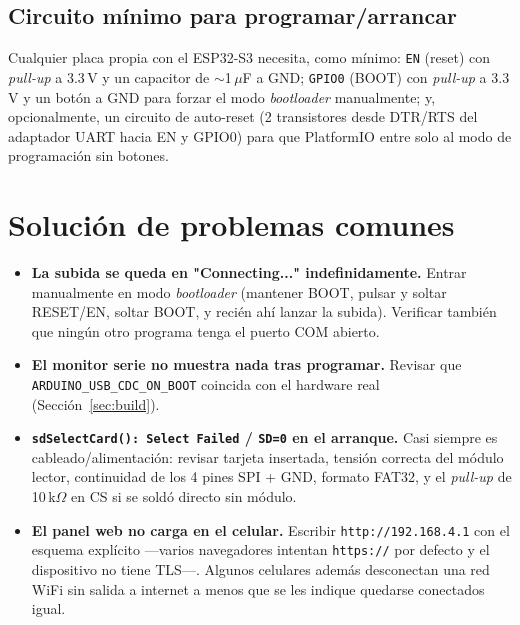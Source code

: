 \subsection{Circuito mínimo para programar/arrancar}
Cualquier placa propia con el ESP32-S3 necesita, como mínimo: \texttt{EN}
(reset) con \textit{pull-up} a 3.3\,V y un capacitor de $\sim$1\,$\mu$F a
GND; \texttt{GPIO0} (BOOT) con \textit{pull-up} a 3.3\,V y un botón a GND
para forzar el modo \textit{bootloader} manualmente; y, opcionalmente, un
circuito de auto-reset (2 transistores desde DTR/RTS del adaptador UART
hacia EN y GPIO0) para que PlatformIO entre solo al modo de programación sin
botones.

\section{Solución de problemas comunes}

\begin{itemize}
  \item \textbf{La subida se queda en "Connecting..." indefinidamente.}
        Entrar manualmente en modo \textit{bootloader} (mantener BOOT,
        pulsar y soltar RESET/EN, soltar BOOT, y recién ahí lanzar la
        subida). Verificar también que ningún otro programa tenga el
        puerto COM abierto.
  \item \textbf{El monitor serie no muestra nada tras programar.} Revisar
        que \texttt{ARDUINO\_USB\_CDC\_ON\_BOOT} coincida con el hardware
        real (Sección~\ref{sec:build}).
  \item \textbf{\texttt{sdSelectCard(): Select Failed} / \texttt{SD=0} en el
        arranque.} Casi siempre es cableado/alimentación: revisar tarjeta
        insertada, tensión correcta del módulo lector, continuidad de los 4
        pines SPI + GND, formato FAT32, y el \textit{pull-up} de
        10\,k$\Omega$ en CS si se soldó directo sin módulo.
  \item \textbf{El panel web no carga en el celular.} Escribir
        \texttt{http://192.168.4.1} con el esquema explícito —varios
        navegadores intentan \texttt{https://} por defecto y el dispositivo
        no tiene TLS—. Algunos celulares además desconectan una red WiFi
        sin salida a internet a menos que se les indique quedarse
        conectados igual.
\end{itemize}
